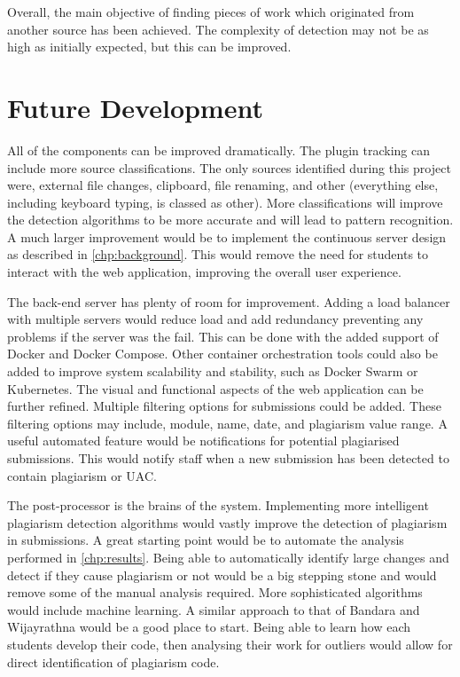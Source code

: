 Overall, the main objective of finding pieces of work which originated from another source has been achieved. The complexity of detection may not be as high as initially expected, but this can be improved.

\section{Future Development}
\label{sec:future-development}
All of the components can be improved dramatically. The plugin tracking can include more source classifications. The only sources identified during this project were, external file changes, clipboard, file renaming, and other (everything else, including keyboard typing, is classed as other). More classifications will improve the detection algorithms to be more accurate and will lead to pattern recognition. A much larger improvement would be to implement the continuous server design as described in \autoref{chp:background}. This would remove the need for students to interact with the web application, improving the overall user experience.

The back-end server has plenty of room for improvement. Adding a load balancer with multiple servers would reduce load and add redundancy preventing any problems if the server was the fail. This can be done with the added support of Docker and Docker Compose. Other container orchestration tools could also be added to improve system scalability and stability, such as Docker Swarm or Kubernetes. The visual and functional aspects of the web application can be further refined. Multiple filtering options for submissions could be added. These filtering options may include, module, name, date, and plagiarism value range. A useful automated feature would be notifications for potential plagiarised submissions. This would notify staff when a new submission has been detected to contain plagiarism or UAC.

The post-processor is the brains of the system. Implementing more intelligent plagiarism detection algorithms would vastly improve the detection of plagiarism in submissions. A great starting point would be to automate the analysis performed in \autoref{chp:results}. Being able to automatically identify large changes and detect if they cause plagiarism or not would be a big stepping stone and would remove some of the manual analysis required. More sophisticated algorithms would include machine learning. A similar approach to that of Bandara and Wijayrathna would be a good place to start\cite{Bandara2012}. Being able to learn how each students develop their code, then analysing their work for outliers would allow for direct identification of plagiarism code.

